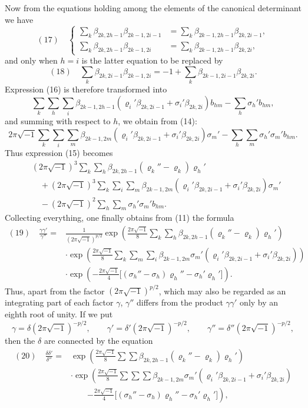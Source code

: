 \documentclass[10pt]{article}
\begin{document}
Now from the equations holding among the elements of the canonical determinant we have
\[
(17)\quad
\left\{\begin{aligned}
\sum_k\beta_{2k,2h-1}\beta_{2k-1,2i-1}
&=\sum_k\beta_{2k-1,2h-1}\beta_{2k,2i-1},\\
\sum_k\beta_{2k,2h-1}\beta_{2k-1,2i}
&=\sum_k\beta_{2k-1,2h-1}\beta_{2k,2i},
\end{aligned}\right.
\]
and only when \(h=i\) is the latter equation to be replaced by
\[
(18)\quad
\sum_k\beta_{2k,2i-1}\beta_{2k-1,2i}
=-1+\sum_k\beta_{2k-1,2i-1}\beta_{2k,2i}.
\]
Expression (16) is therefore transformed into
\[
\sum_k\sum_h\sum_i\beta_{2k-1,2h-1}(\varrho_i'\beta_{2k,2i-1}+\sigma_i'\beta_{2k,2i})b_{hm}
-
\sum_h\sigma_h'b_{hm},
\]
and summing with respect to \(h\), we obtain from (14):
\[
2\pi\sqrt{-1}\sum_k\sum_i\sum_m\beta_{2k-1,2m}(\varrho_i'\beta_{2k,2i-1}+\sigma_i'\beta_{2k,2i})\sigma_m'
-
\sum_h\sum_m\sigma_h'\sigma_m'b_{hm}.
\]
Thus expression (15) becomes
\[
\begin{aligned}
&(2\pi\sqrt{-1})^3\sum_k\sum_h\beta_{2k,2h-1}(\varrho_k''-\varrho_k)\varrho_h'\\
&\quad+(2\pi\sqrt{-1})^3\sum_k\sum_i\sum_m\beta_{2k-1,2m}(\varrho_i'\beta_{2k,2i-1}+\sigma_i'\beta_{2k,2i})\sigma_m'\\
&\quad-(2\pi\sqrt{-1})^2\sum_h\sum_m\sigma_h'\sigma_m'b_{hm}.
\end{aligned}
\]
Collecting everything, one finally obtains from (11) the formula
\[
\begin{aligned}
(19)\quad
\frac{\gamma\gamma'}{\gamma''}
={}&\frac{1}{(2\pi\sqrt{-1})^{p/2}}
\exp\!\left(\frac{2\pi\sqrt{-1}}{8}\sum_k\sum_h\beta_{2k,2h-1}(\varrho_k''-\varrho_k)\varrho_h'\right)\\
&\cdot\exp\!\left(\frac{2\pi\sqrt{-1}}{8}\sum_k\sum_m\sum_i\beta_{2k-1,2m}\sigma_m'(\varrho_i'\beta_{2k,2i-1}+\sigma_i'\beta_{2k,2i})\right)\\
&\cdot\exp\!\left(-\frac{2\pi\sqrt{-1}}{4}\bigl[(\sigma_h''-\sigma_h)\varrho_h''-\sigma_h'\varrho_h'\bigr]\right).
\end{aligned}
\]
Thus, apart from the factor \((2\pi\sqrt{-1})^{p/2}\), which may also be regarded as an integrating part of each factor \(\gamma\), \(\gamma''\) differs from the product \(\gamma\gamma'\) only by an eighth root of unity. If we put
\[
\gamma=\delta(2\pi\sqrt{-1})^{-p/2},\qquad
\gamma'=\delta'(2\pi\sqrt{-1})^{-p/2},\qquad
\gamma''=\delta''(2\pi\sqrt{-1})^{-p/2},
\]
then the \(\delta\) are connected by the equation
\[
\begin{aligned}
(20)\quad
\frac{\delta\delta'}{\delta''}
={}&\exp\!\left(\frac{2\pi\sqrt{-1}}{8}\sum\sum\beta_{2k,2h-1}(\varrho_k''-\varrho_k)\varrho_h'\right)\\
&\cdot\exp\!\left(
\frac{2\pi\sqrt{-1}}{8}\sum\sum\sum\beta_{2k-1,2m}\sigma_m'(\varrho_i'\beta_{2k,2i-1}+\sigma_i'\beta_{2k,2i})
\right.\\
&\qquad\left.
-\frac{2\pi\sqrt{-1}}{4}\bigl[(\sigma_h''-\sigma_h)\varrho_h''-\sigma_h'\varrho_h'\bigr]\right),
\end{aligned}
\]
\end{document}
